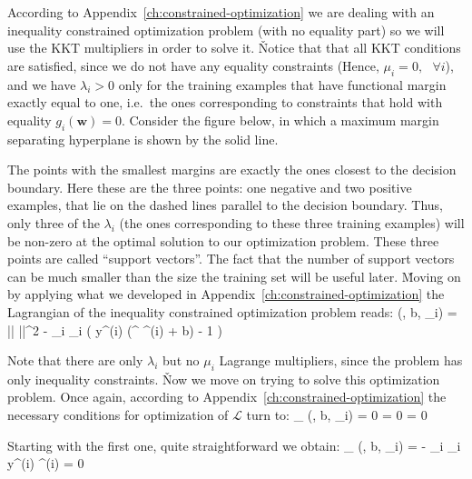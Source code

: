 According to Appendix~\ref{ch:constrained-optimization} we are dealing with an inequality constrained optimization
problem (with no equality part) so we will use the KKT multipliers in order to solve it. \v

Notice that that all KKT conditions are satisfied, since we do not have any equality constraints (Hence, $\mu_{i} = 0,
\:\:\: \forall i$), and we have $\lambda_{i} > 0$ only for the training examples that have functional margin exactly
equal to one, i.e.\ the ones corresponding to constraints that hold with equality $ g_{i}(\boldsymbol{w}) = 0$.
Consider the figure below, in which a maximum margin separating hyperplane is shown by the solid line.


\vspace{-10pt}

The points with the smallest margins are exactly the ones closest to the decision boundary. Here these are the three
points: one negative and two positive examples, that lie on the dashed lines parallel to the decision boundary. Thus,
only three of the $\lambda_{i}$ (the ones corresponding to these three training examples) will be non-zero at the
optimal solution to our optimization problem. These three points are called ``support vectors''. The fact that the
number of support vectors can be much smaller than the size the training set will be useful later. \v

Moving on by applying what we developed in Appendix~\ref{ch:constrained-optimization} the Lagrangian of the
inequality constrained optimization problem reads:
\bse
{}(, b, \lambda_{i}) =  ||  ||^2 - \sum_{i} \lambda_{i} \left( y^{(i)}
(^{\intercal} ^{(i)} + b) - 1 \right)
\ese

Note that there are only $\lambda_{i}$ but no $\mu_{i}$ Lagrange multipliers, since the problem has only inequality
constraints. \v

Now we move on trying to solve this optimization problem. Once again, according to
Appendix~\ref{ch:constrained-optimization} the necessary conditions for optimization of $ \mathcal{L}$ turn to:
\bse
\nabla_{} (, b, \lambda_{i}) = 0 \:\:\:  \:\:\:
 = 0 \:\:\:  \:\:\:
 = 0
\ese

Starting with the first one, quite straightforward we obtain:
\bse
\nabla_{} (, b, \lambda_{i}) =  - \sum_{i} \lambda_{i} y^{(i)}
^{(i)} = 0
\ese

